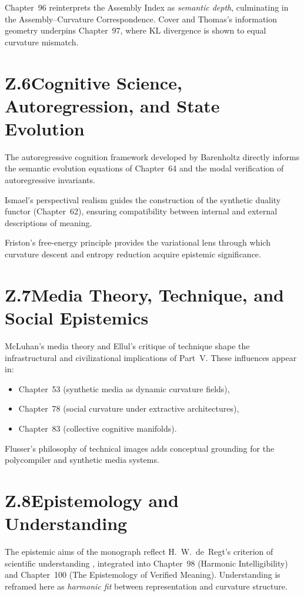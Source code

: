 Chapter~96 reinterprets the Assembly Index as \emph{semantic depth},
culminating in the Assembly--Curvature Correspondence.  
Cover and Thomas’s information geometry \cite{cover2006elements}
underpins Chapter~97, where KL divergence is shown to equal curvature mismatch.

\section*{Z.6\quad Cognitive Science, Autoregression, and State Evolution}
The autoregressive cognition framework developed by Barenholtz
\cite{barenholtz2025autoregressive} directly informs the semantic evolution
equations of Chapter~64 and the modal verification of autoregressive invariants.

Ismael’s perspectival realism \cite{ismael2021perspectival}
guides the construction of the synthetic duality functor (Chapter~62),
ensuring compatibility between internal and external descriptions of meaning.

Friston’s free-energy principle \cite{friston2010free}
provides the variational lens through which curvature descent and entropy reduction
acquire epistemic significance.

\section*{Z.7\quad Media Theory, Technique, and Social Epistemics}
McLuhan’s media theory and Ellul’s critique of technique \cite{ellul1964technological}
shape the infrastructural and civilizational implications of Part~V.  
These influences appear in:
\begin{itemize}
    \item Chapter~53 (synthetic media as dynamic curvature fields),
    \item Chapter~78 (social curvature under extractive architectures),
    \item Chapter~83 (collective cognitive manifolds).
\end{itemize}

Flusser’s philosophy of technical images adds conceptual grounding for the
polycompiler and synthetic media systems.

\section*{Z.8\quad Epistemology and Understanding}
The epistemic aims of the monograph reflect H.~W.~de~Regt’s criterion of
scientific understanding \cite{deregt2020understanding},  
integrated into Chapter~98 (Harmonic Intelligibility) and
Chapter~100 (The Epistemology of Verified Meaning).  
Understanding is reframed here as \emph{harmonic fit} between representation and
curvature structure.

